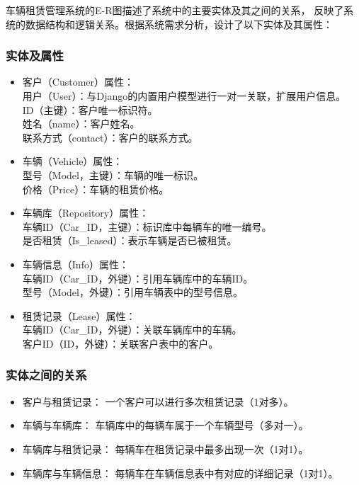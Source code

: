 \documentclass[UTF8,a4paper,12pt]{ctexart}
\begin{document}
车辆租赁管理系统的E-R图描述了系统中的主要实体及其之间的关系，
反映了系统的数据结构和逻辑关系。根据系统需求分析，设计了以下实体及其属性：

\subsubsection{实体及属性}

\begin{itemize}
    \item 客户（Customer）属性：\\
    用户（User）：与Django的内置用户模型进行一对一关联，扩展用户信息。\\
    ID（主键）：客户唯一标识符。\\
    姓名（name）：客户姓名。\\
    联系方式（contact）：客户的联系方式。\\

    \item 车辆（Vehicle）属性：\\
    型号（Model，主键）：车辆的唯一标识。\\
    价格（Price）：车辆的租赁价格。\\

    \item 车辆库（Repository）属性：\\
    车辆ID（Car\_ID，主键）：标识库中每辆车的唯一编号。\\
    是否租赁（Is\_leased）：表示车辆是否已被租赁。\\

    \item 车辆信息（Info）属性：\\
    车辆ID（Car\_ID，外键）：引用车辆库中的车辆ID。\\
    型号（Model，外键）：引用车辆表中的型号信息。\\
    
    \item 租赁记录（Lease）属性：\\
    车辆ID（Car\_ID，外键）：关联车辆库中的车辆。\\
    客户ID（ID，外键）：关联客户表中的客户。\\
\end{itemize}

\subsubsection{实体之间的关系} 
\begin{itemize}
\item 客户与租赁记录：
一个客户可以进行多次租赁记录（1对多）。

\item 车辆与车辆库：
车辆库中的每辆车属于一个车辆型号（多对一）。

\item 车辆库与租赁记录：
每辆车在租赁记录中最多出现一次（1对1）。

\item 车辆库与车辆信息：
每辆车在车辆信息表中有对应的详细记录（1对1）。
\end{itemize}
\end{document}
